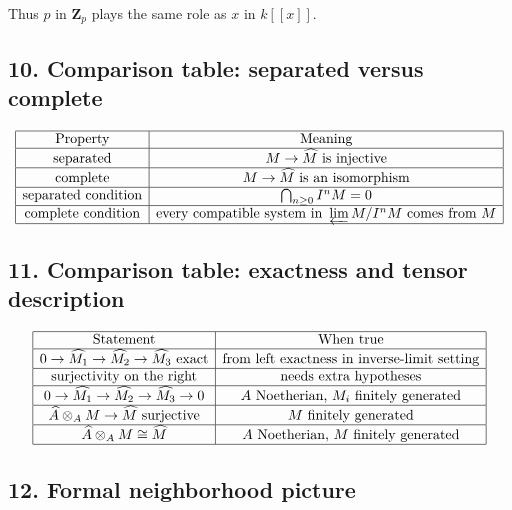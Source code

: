 \documentclass[12pt,a4paper]{article}
\theoremstyle{plain}
\theoremstyle{definition}      %
\begin{document}
Thus \(p\) in \(\mathbf Z_p\) plays the same role as \(x\) in \(k[[x]]\).

\subsection*{10. Comparison table: separated versus complete}

\[
\begin{array}{|c|c|}
	\hline
	\text{Property} & \text{Meaning} \\
	\hline
	\text{separated} & M\to \widehat M \text{ is injective} \\
	\hline
	\text{complete} & M\to \widehat M \text{ is an isomorphism} \\
	\hline
	\text{separated condition} & \bigcap_{n\ge0} I^nM=0 \\
	\hline
	\text{complete condition} & \text{every compatible system in }\varprojlim M/I^nM \text{ comes from }M \\
	\hline
\end{array}
\]

\subsection*{11. Comparison table: exactness and tensor description}

\[
\begin{array}{|c|c|}
	\hline
	\text{Statement} & \text{When true} \\
	\hline
	0\to \widehat{M_1}\to \widehat{M_2}\to \widehat{M_3}\text{ exact}
	& \text{from left exactness in inverse-limit setting} \\
	\hline
	\text{surjectivity on the right}
	& \text{needs extra hypotheses} \\
	\hline
	0\to \widehat{M_1}\to \widehat{M_2}\to \widehat{M_3}\to 0
	& A \text{ Noetherian, }M_i\text{ finitely generated} \\
	\hline
	\widehat A\otimes_A M\to \widehat M \text{ surjective}
	& M \text{ finitely generated} \\
	\hline
	\widehat A\otimes_A M\cong \widehat M
	& A \text{ Noetherian, }M \text{ finitely generated} \\
	\hline
\end{array}
\]

\subsection*{12. Formal neighborhood picture}
\end{document}

